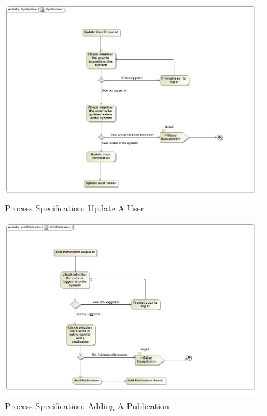\documentclass[a4paper]{article}
\begin{document}
	\begin{figure}[H]
	    \centering
	    \includegraphics[width=\textwidth]{UpdateUser.jpg}
	    \caption{Process Specification: Update A User}
	\end{figure}
		\begin{figure}[H]
	    \centering
	    \includegraphics[width=\textwidth]{AddPublication.jpg}
	    \caption{Process Specification: Adding A Publication}
	\end{figure}
\end{document}
